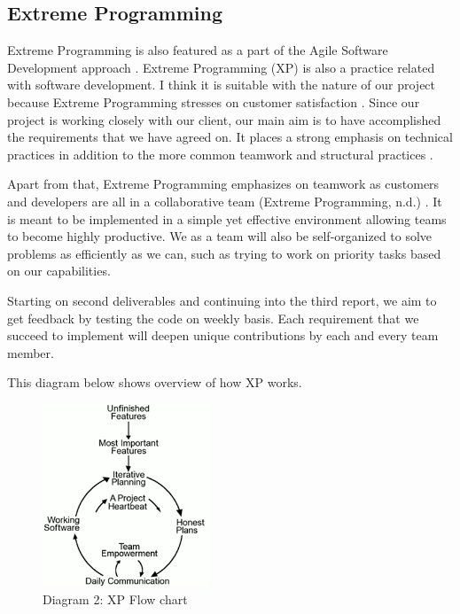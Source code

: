 	
	\subsection*{Extreme Programming}
		Extreme Programming is also featured as a part of the Agile Software Development approach \cite{agileModeling}. Extreme Programming (XP) is also a practice related with software development. I think it is suitable with the nature of our project because Extreme Programming stresses on customer satisfaction \cite{agileXPFlowchart}. Since our project is working closely with our client, our main aim is to have accomplished the requirements that we have agreed on.  It places a strong emphasis on technical practices in addition to the more common teamwork and structural practices \cite{agileArtOfDevelopment}.
			
		Apart from that, Extreme Programming emphasizes on teamwork as customers and developers are all in a collaborative team (Extreme Programming, n.d.) \cite{agileXPFlowchart}. It is meant to be implemented in a simple yet effective environment allowing teams to become highly productive. We as a team will also be self-organized to solve problems as efficiently as we can, such as trying to  work on priority tasks based on our capabilities.
		
		Starting on second deliverables and continuing into the third report, we aim to get feedback by testing the code on weekly basis. Each requirement that we succeed to implement will deepen unique contributions by each and every team member. 
		
		This diagram below shows overview of how XP works.  
		
		\begin{figure}[!htbp]
			\centerline{\includegraphics[width=5cm]{resources/agileflowchart.jpg}}
			\caption{Diagram 2: XP Flow chart \cite{agileXPFlowchart}}
		\end{figure}
		
